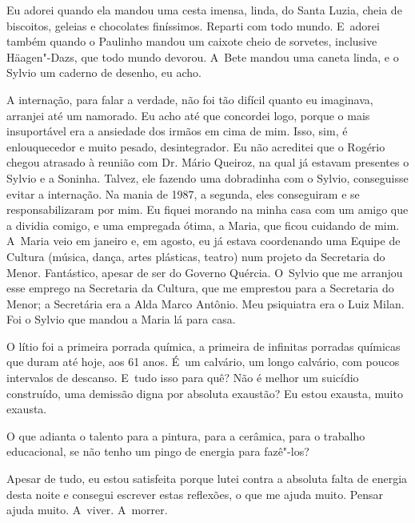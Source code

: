 Eu adorei quando ela mandou uma cesta imensa, linda, do Santa Luzia,
cheia de biscoitos, geleias e chocolates finíssimos. Reparti com todo
mundo. E~adorei também quando o Paulinho mandou um caixote cheio de
sorvetes, inclusive Häagen"-Dazs, que todo mundo devorou. A~Bete mandou
uma caneta linda, e o Sylvio um caderno de desenho, eu acho.

A internação, para falar a verdade, não foi tão difícil quanto eu
imaginava, arranjei até um namorado. Eu acho até que concordei logo,
porque o mais insuportável era a ansiedade dos irmãos em cima de mim.
Isso, sim, é enlouquecedor e muito pesado, desintegrador. Eu não
acreditei que o Rogério chegou atrasado à reunião com Dr. Mário Queiroz,
na qual já estavam presentes o Sylvio e a Soninha. Talvez, ele fazendo
uma dobradinha com o Sylvio, conseguisse evitar a internação. Na mania
de 1987, a segunda, eles conseguiram e se responsabilizaram por mim. Eu
fiquei morando na minha casa com um amigo que a dividia comigo, e uma
empregada ótima, a Maria, que ficou cuidando de mim. A~Maria veio em
janeiro e, em agosto, eu já estava coordenando uma Equipe de Cultura
(música, dança, artes plásticas, teatro) num projeto da Secretaria do
Menor. Fantástico, apesar de ser do Governo Quércia. O~Sylvio que me
arranjou esse emprego na Secretaria da Cultura, que me emprestou para a
Secretaria do Menor; a Secretária era a Alda Marco Antônio. Meu
psiquiatra era o Luiz Milan. Foi o Sylvio que mandou a Maria lá para
casa.

O lítio foi a primeira porrada química, a primeira de infinitas porradas
químicas que duram até hoje, aos 61 anos. É~um calvário, um longo
calvário, com poucos intervalos de descanso. E~tudo isso para quê? Não é
melhor um suicídio construído, uma demissão digna por absoluta exaustão?
Eu estou exausta, muito exausta.

O que adianta o talento para a pintura, para a cerâmica, para o trabalho
educacional, se não tenho um pingo de energia para fazê"-los?

Apesar de tudo, eu estou satisfeita porque lutei contra a absoluta falta
de energia desta noite e consegui escrever estas reflexões, o que me
ajuda muito. Pensar ajuda muito. A~viver. A~morrer.

